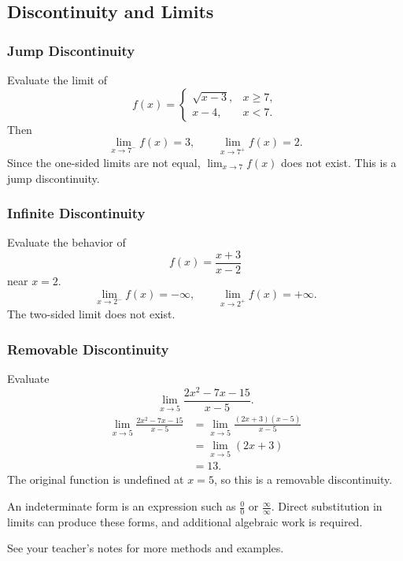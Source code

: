\subsection{Discontinuity and Limits}

\subsubsection{Jump Discontinuity}
\begin{example}
Evaluate the limit of
\[
  f(x)=
  \begin{cases}
    \sqrt{x-3}, & x\ge 7, \\
    x-4, & x<7.
  \end{cases}
\]
Then
\[
  \lim_{x\to 7^-}f(x)=3,
  \qquad
  \lim_{x\to 7^+}f(x)=2.
\]
Since the one-sided limits are not equal, $\lim_{x\to 7}f(x)$ does not exist. This is a jump discontinuity.
\end{example}

\subsubsection{Infinite Discontinuity}
\begin{example}
Evaluate the behavior of
\[
  f(x)=\frac{x+3}{x-2}
\]
near $x=2$.
\[
  \lim_{x\to 2^-}f(x)=-\infty,
  \qquad
  \lim_{x\to 2^+}f(x)=+\infty.
\]
The two-sided limit does not exist.
\end{example}

\subsubsection{Removable Discontinuity}
\begin{example}
Evaluate
\[
  \lim_{x\to 5}\frac{2x^2-7x-15}{x-5}.
\]
\begin{align*}
  \lim_{x\to 5}\frac{2x^2-7x-15}{x-5}
  &= \lim_{x\to 5}\frac{(2x+3)(x-5)}{x-5} \\
  &= \lim_{x\to 5}(2x+3) \\
  &= 13.
\end{align*}
The original function is undefined at $x=5$, so this is a removable discontinuity.
\end{example}

\begin{definition}
An indeterminate form is an expression such as $\frac{0}{0}$ or $\frac{\infty}{\infty}$. Direct substitution in limits can produce these forms, and additional algebraic work is required.
\end{definition}

\begin{remark}
See your teacher's notes for more methods and examples.
\end{remark}
